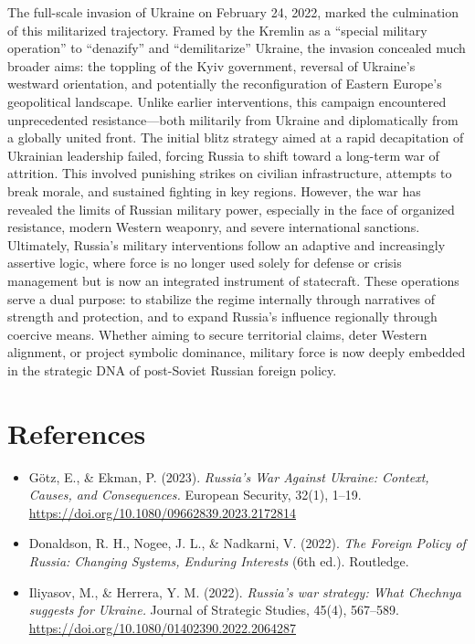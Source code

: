 \documentclass[12pt]{article}
\begin{document}
The full-scale invasion of Ukraine on February 24, 2022, marked the culmination of this militarized trajectory. Framed by the Kremlin as a “special military operation” to “denazify” and “demilitarize” Ukraine, the invasion concealed much broader aims: the toppling of the Kyiv government, reversal of Ukraine’s westward orientation, and potentially the reconfiguration of Eastern Europe’s geopolitical landscape. Unlike earlier interventions, this campaign encountered unprecedented resistance—both militarily from Ukraine and diplomatically from a globally united front. The initial blitz strategy aimed at a rapid decapitation of Ukrainian leadership failed, forcing Russia to shift toward a long-term war of attrition. This involved punishing strikes on civilian infrastructure, attempts to break morale, and sustained fighting in key regions. However, the war has revealed the limits of Russian military power, especially in the face of organized resistance, modern Western weaponry, and severe international sanctions.
Ultimately, Russia’s military interventions follow an adaptive and increasingly assertive logic, where force is no longer used solely for defense or crisis management but is now an integrated instrument of statecraft. These operations serve a dual purpose: to stabilize the regime internally through narratives of strength and protection, and to expand Russia’s influence regionally through coercive means. Whether aiming to secure territorial claims, deter Western alignment, or project symbolic dominance, military force is now deeply embedded in the strategic DNA of post-Soviet Russian foreign policy.


\newpage
\section*{References}
\begin{itemize}[leftmargin=*, label={}]
    \item Götz, E., \& Ekman, P. (2023). \textit{Russia’s War Against Ukraine: Context, Causes, and Consequences.} European Security, 32(1), 1–19. \url{https://doi.org/10.1080/09662839.2023.2172814}
    \item Donaldson, R. H., Nogee, J. L., \& Nadkarni, V. (2022). \textit{The Foreign Policy of Russia: Changing Systems, Enduring Interests} (6th ed.). Routledge.
    \item Iliyasov, M., \& Herrera, Y. M. (2022). \textit{Russia’s war strategy: What Chechnya suggests for Ukraine.} Journal of Strategic Studies, 45(4), 567–589. \url{https://doi.org/10.1080/01402390.2022.2064287}
\end{itemize}
\end{document}
